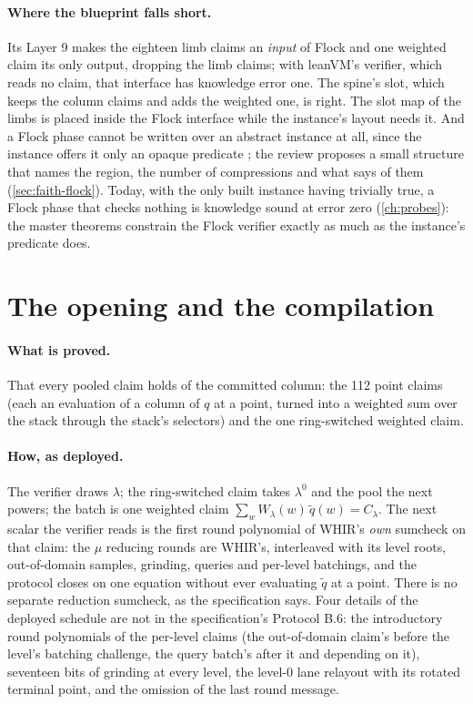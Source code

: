 \paragraph{Where the blueprint falls short.} Its Layer 9 makes the eighteen limb claims an
\emph{input} of Flock and one weighted claim its only output, dropping the limb claims; with
leanVM's verifier, which reads no claim, that interface has knowledge error one. The spine's
slot, which keeps the column claims and adds the weighted one, is right. The slot map of the
limbs is placed inside the Flock interface while the instance's layout needs it. And a Flock
phase cannot be written over an abstract instance at all, since the instance offers it only an
opaque predicate ; the review proposes a small structure that names the region, the
number of compressions and what  says of them (\cref{sec:faith-flock}). Today, with
the only built instance having  trivially true, a Flock phase that checks nothing is
knowledge sound at error zero (\cref{ch:probes}): the master theorems constrain the Flock
verifier exactly as much as the instance's predicate does.

\section{The opening and the compilation}\label{sec:ph-opening}

\paragraph{What is proved.} That every pooled claim holds of the committed column: the 112
point claims (each an evaluation of a column of $q$ at a point, turned into a weighted sum over
the stack through the stack's selectors) and the one ring-switched weighted claim.

\paragraph{How, as deployed.} The verifier draws $\lambda$; the ring-switched claim takes
$\lambda^0$ and the pool the next powers; the batch is one weighted claim
$\sum_w W_\lambda(w)\, \widetilde{q}(w) = C_\lambda$. The next scalar the verifier reads is the
first round polynomial of WHIR's \emph{own} sumcheck on that claim: the $\mu$ reducing rounds
are WHIR's, interleaved with its level roots, out-of-domain samples, grinding, queries and
per-level batchings, and the protocol closes on one equation without ever evaluating
$\widetilde{q}$ at a point. There is no separate reduction sumcheck, as the specification says.
Four details of the deployed schedule are not in the specification's Protocol B.6: the
introductory round polynomials of the per-level claims (the out-of-domain claim's before the
level's batching challenge, the query batch's after it and depending on it), seventeen bits of
grinding at every level, the level-0 lane relayout with its rotated terminal point, and the
omission of the last round message.

